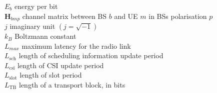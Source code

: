 
$E_b$ \mytab energy per bit \\



$\bm{H}_{bmp}$ \mytab channel matrix between BS $b$ and UE $m$ in BSs polarisation $p$\\

$j$ \mytab imaginary unit $\left(j = \sqrt{-1}\right)$\\


$k_B$ \mytab Boltzmann constant\\

$L_{max}$ \mytab maximum latency for the radio link \\
$L_\text{sch}$  \mytab length of scheduling information update period \\
$L_\text{csi}$  \mytab length of \acs{CSI} update period \\
$L_\text{slot}$ \mytab length of slot period \\
$L_\text{TB}$ \mytab length of a transport block, in bits \\


